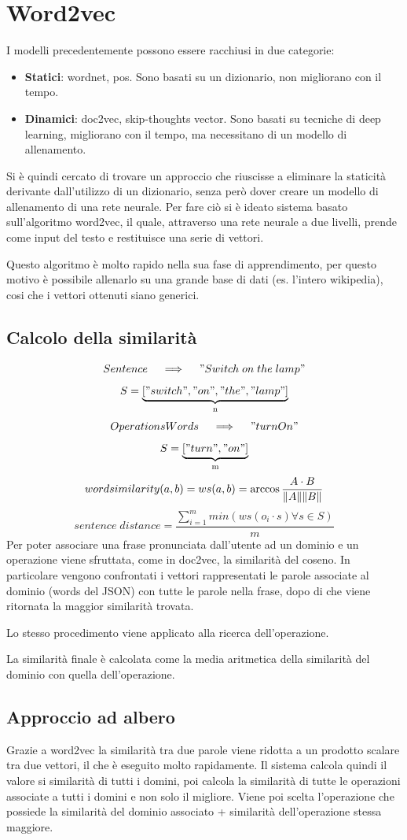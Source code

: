 \documentclass[twoside]{supsistudent}
\begin{document}
\section{Word2vec}
I modelli precedentemente possono essere racchiusi in due categorie:
\begin{itemize}
  \item \textbf{Statici}: wordnet, pos. Sono basati su un dizionario, non migliorano con il tempo.
  \item \textbf{Dinamici}: doc2vec, skip-thoughts vector. Sono basati su tecniche di deep learning, migliorano con il tempo, ma necessitano di un modello di allenamento.
\end{itemize}
Si è quindi cercato di trovare un approccio che riuscisse a eliminare la staticità derivante dall'utilizzo di un dizionario, senza però dover creare un modello di allenamento di una rete neurale.
Per fare ciò si è ideato sistema basato sull'algoritmo word2vec, il quale, attraverso una rete neurale a due livelli, prende come input del testo e restituisce una serie di vettori. 

Questo algoritmo è molto rapido nella sua fase di apprendimento, per questo motivo è possibile allenarlo su una grande base di dati (es. l'intero wikipedia), cosi che i vettori ottenuti siano generici.\cite{word2vec}
\subsection{Calcolo della similarità}
 \[
 Sentence \quad\implies\quad "Switch\;on\;the\;lamp"
 \]
 \[
 S = 
\underbrace{["switch","on","the","lamp"]}_\text{n}
\]
 \[
 OperationsWords \quad\implies\quad "turnOn"
 \]
 \[
 S = 
\underbrace{["turn","on"]}_\text{m}
\]
 \[
 word similarity (a,b)= ws(a,b) = \arccos{{A \cdot B \over \|A\| \|B\|}}  
\]
 \[
 sentence\;distance = \frac{\sum_{i=1}^{m} min(ws(o_i \cdot s)\forall s \in S)} {m}
 \]
Per poter associare una frase pronunciata dall'utente ad un dominio e un operazione viene sfruttata, come in doc2vec, la similarità del coseno. In particolare vengono confrontati i vettori rappresentati le parole associate al dominio (words del JSON) con tutte le parole nella frase, dopo di che viene ritornata la maggior similarità trovata.

Lo stesso procedimento viene applicato alla ricerca dell'operazione. 

La similarità finale è calcolata come la media aritmetica della similarità del dominio con quella dell'operazione.
\subsection{Approccio ad albero}
Grazie a word2vec la similarità tra due parole viene ridotta a un prodotto scalare tra due vettori, il che è eseguito molto rapidamente. Il sistema calcola quindi il valore si similarità di tutti i domini, poi calcola la similarità di tutte le operazioni associate a tutti i domini e non solo il migliore. Viene poi scelta l'operazione che possiede la similarità del dominio associato + similarità dell'operazione stessa maggiore.
\end{document}
